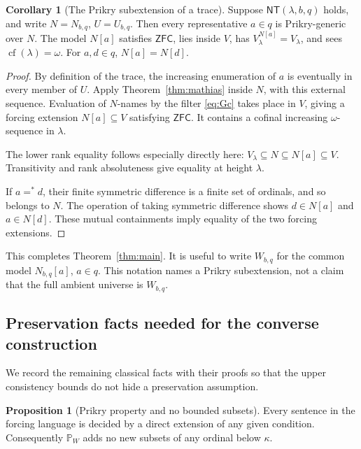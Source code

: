 \documentclass[11pt,letterpaper]{article}
\theoremstyle{definition}
\newtheorem{proposition}[definition]{Proposition}
\newtheorem{corollary}[definition]{Corollary}
\numberwithin{equation}{section}
\newcommand{\ZFC}{\mathsf{ZFC}}
\newcommand{\cf}{\operatorname{cf}}
\newcommand{\PP}{\mathbb P}
\newcommand{\NT}{\mathsf{NT}}
\begin{document}
\begin{corollary}[The Prikry subextension of a trace]\label{cor:factor}
Suppose $\NT(\lambda,b,q)$ holds, and write $N=N_{b,q}$,
$U=U_{b,q}$. Then every representative $a\in q$ is Prikry-generic over
$N$. The model $N[a]$ satisfies $\ZFC$, lies inside $V$, has
$V_\lambda^{N[a]}=V_\lambda$, and sees $\cf(\lambda)=\omega$.
For $a,d\in q$, $N[a]=N[d]$.
\end{corollary}

\begin{proof}
By definition of the trace, the increasing enumeration of $a$ is
eventually in every member of $U$. Apply Theorem~\ref{thm:mathias}
inside $N$, with this external sequence. Evaluation of $N$-names by the
filter \eqref{eq:Gc} takes place in $V$, giving a forcing extension
$N[a]\subseteq V$ satisfying $\ZFC$. It contains a cofinal increasing
$\omega$-sequence in $\lambda$.

The lower rank equality follows especially directly here:
$V_\lambda\subseteq N\subseteq N[a]\subseteq V$. Transitivity and
rank absoluteness give equality at height $\lambda$.

If $a=^*d$, their finite symmetric difference is a finite set of
ordinals, and so belongs to $N$. The operation of taking symmetric
difference shows $d\in N[a]$ and $a\in N[d]$. These mutual
containments imply equality of the two forcing extensions.
\end{proof}

This completes Theorem~\ref{thm:main}. It is useful to write $W_{b,q}$
for the common model $N_{b,q}[a]$, $a\in q$. This notation names a
Prikry subextension, not a claim that the full ambient universe is
$W_{b,q}$.

\subsection{Preservation facts needed for the converse construction}

We record the remaining classical facts with their proofs so that the
upper consistency bounds do not hide a preservation assumption.

\begin{proposition}[Prikry property and no bounded subsets]\label{prop:prikry-property}
Every sentence in the forcing language is decided by a direct
extension of any given condition. Consequently $\PP_W$ adds no new
subsets of any ordinal below $\kappa$.
\end{proposition}
\end{document}
